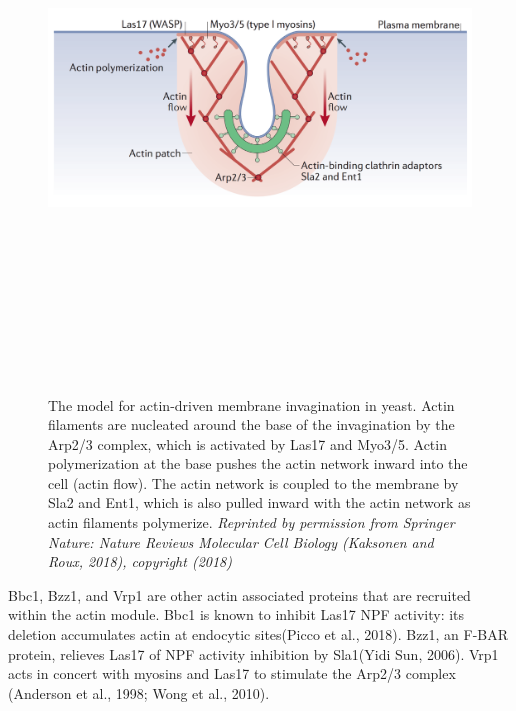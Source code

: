 


	\begin{figure}[H]
	\centering
		\includegraphics[width=15cm, height=15cm, keepaspectratio]{figures/intro/actin_kaksonen}
	\caption[Actin network in endocytosis]
	{The model for actin-driven membrane invagination in yeast. Actin filaments are nucleated around the base of the invagination by the Arp2/3 complex, which is activated by Las17 and Myo3/5. Actin polymerization at the base pushes the actin network inward into the cell (actin flow). The actin network is coupled to the membrane by Sla2 and Ent1, which is also pulled inward with the actin network as actin filaments polymerize. \textit{Reprinted by permission from Springer Nature: Nature Reviews Molecular Cell Biology (Kaksonen and Roux, 2018), copyright (2018)
	\label{intro_actin_netork}}}
\end{figure}


		\vspace{5mm}
Bbc1, Bzz1, and Vrp1 are other actin associated proteins that are recruited within the actin module. Bbc1 is known to inhibit Las17 NPF activity: its deletion accumulates actin at endocytic sites(Picco et al., 2018). Bzz1, an F-BAR protein, relieves Las17 of NPF activity inhibition by Sla1(Yidi Sun, 2006). Vrp1 acts in concert with myosins and Las17 to stimulate the Arp2/3 complex (Anderson et al., 1998; Wong et al., 2010). 

